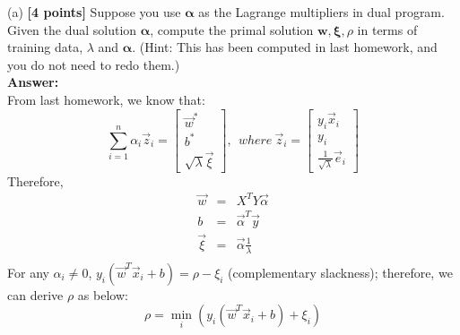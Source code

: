 (a) \textbf{[4 points]} Suppose you use $\boldsymbol{\alpha}$ as the Lagrange multipliers in dual program. Given the dual solution $\boldsymbol{\alpha}$, compute the primal solution $\boldsymbol{w}, \boldsymbol{\xi}, \rho$ in terms of training data, $\lambda$ and $\boldsymbol{\alpha}$. (Hint: This has been computed in last homework, and you do not need to redo them.) \\
\textbf{Answer:}\\
From last homework, we know that:
\begin{equation}
\nonumber
\sum_{i=1}^{n}\alpha_i \vec{z}_i=\left[
\begin{array}{c}
\vec{w}^* \\
b^* \\
\sqrt{\lambda}\vec{\xi}
\end{array}\right],~~where~\vec{z}_{i}=\left[\begin{array}{c}
y_{i}\vec{x}_{i}\\
y_{i}\\
\frac{1}{\sqrt{\lambda}}\vec{e}_{i}
\end{array}\right]
\end{equation}
Therefore, 
\begin{equation}
\nonumber
\begin{array}{rcl}
\vec{w} & = & X^TY\vec{\alpha}\\
b & = & \vec{\alpha}^T\vec{y}\\
\vec{\xi} & = & \vec{\alpha}\frac{1}{\lambda} \\
\end{array}
\end{equation}
For any $\alpha_i\neq0$, $y_i(\vec{w}^T\vec{x}_i+b)=\rho-\xi_i$ (complementary slackness); therefore, we can derive $\rho$ as below:
$$\rho = \min_i(y_i(\vec{w}^T\vec{x}_i+b)+\xi_i)$$

